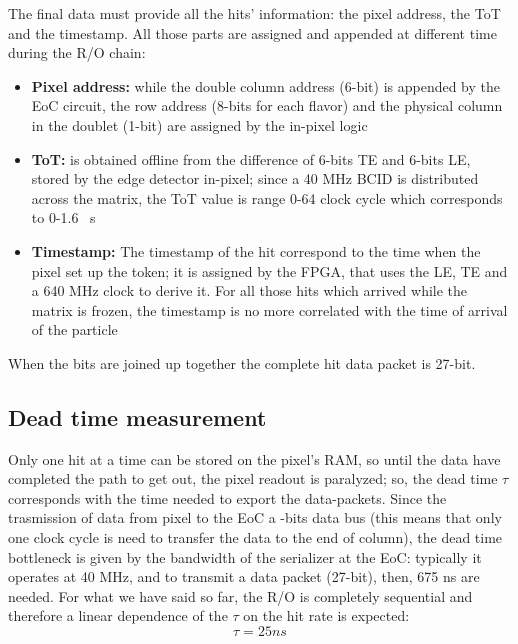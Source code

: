     
    The final data must provide all the hits' information: the pixel address, the ToT and the timestamp. All those parts are assigned and appended at different time during the R/O chain:  
    \begin{itemize}
        \item\textbf{Pixel address:} while the double column address (6-bit) is appended by the EoC circuit, the row address (8-bits for each flavor) and the physical column in the doublet (1-bit) are assigned by the in-pixel logic      
        \item \textbf{ToT:} is obtained offline from the difference of 6-bits TE and 6-bits LE, stored by the edge detector in-pixel; since a 40 MHz BCID is distributed across the matrix, the ToT value is range 0-64 clock cycle which corresponds to 0-1.6 \si{\mu s}  
        \item \textbf{Timestamp:} The timestamp of the hit correspond to the time when the pixel set up the token; it is assigned by the FPGA, that uses the LE, TE and a 640 MHz clock to derive it. For all those hits which arrived while the matrix is frozen, the timestamp is no more correlated with the time of arrival of the particle         
    \end{itemize}
    When the bits are joined up together the complete hit data packet is 27-bit. 

    \subsection{Dead time measurement}
        Only one hit at a time can be stored on the pixel's RAM, so until the data have completed the path to get out, the pixel readout is paralyzed; so, the dead time $\tau$ corresponds with the time needed to export the data-packets. 
        Since the trasmission of data from pixel to the EoC  a -bits data bus (this means that only one clock cycle is need to transfer the data to the end of column), the dead time bottleneck is given by the bandwidth of the serializer at the EoC: typically it operates at 40 MHz, and to transmit a data packet (27-bit), then, 675 \si{ns} are needed. 
        For what we have said so far, the R/O is completely sequential and therefore a linear dependence of the $\tau$ on the hit rate is expected:
        \begin{equation}
            \tau = 25 \unit{ns} 
        \end{equation}




